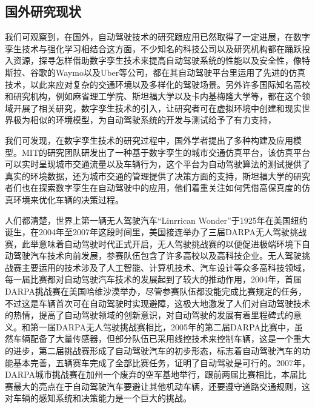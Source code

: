 \subsection{国外研究现状}
我们可观察到，在国外，自动驾驶技术的研究跟应用已然取得了一定进展，在数字孪生技术与强化学习相结合这方面，不少知名的科技公司以及研究机构都在踊跃投入资源，探寻怎样借助数字孪生技术来提高自动驾驶系统的性能以及安全性，像特斯拉、谷歌的Waymo以及Uber等公司，都在其自动驾驶平台里运用了先进的仿真技术，以此来应对复杂的交通环境以及多样化的驾驶场景。另外许多国际知名高校和研究机构，例如麻省理工学院、斯坦福大学以及卡内基梅隆大学等，都在这个领域开展了相关研究，数字孪生技术的引入，让研究者可在虚拟环境中创建和现实世界极为相似的环境模型，为自动驾驶系统的开发与测试给予了有力支持，

我们可发现，在数字孪生技术的研究过程中，国外学者提出了多种构建及应用模型。MIT的研究团队研发出了一种基于数字孪生的城市交通仿真平台，该仿真平台可以实时呈现城市交通流量以及车辆行为，这个平台为自动驾驶算法的测试提供了真实的环境数据，还为城市交通的管理提供了决策方面的支持，斯坦福大学的研究者们也在探索数字孪生在自动驾驶中的应用，他们着重关注如何凭借高保真度的仿真环境来优化车辆的决策过程。

人们都清楚，世界上第一辆无人驾驶汽车“Linrrican Wonder”于1925年在美国纽约诞生，在2004年至2007年这段时间里，美国接连举办了三届DARPA无人驾驶挑战赛，此举意味着自动驾驶时代正式开启，无人驾驶挑战赛的以便促进极端环境下自动驾驶汽车技术向前发展，参赛队伍包含了许多高校以及高科技企业。无人驾驶挑战赛主要运用的技术涉及了人工智能、计算机技术、汽车设计等众多高科技领域，每一届比赛都对自动驾驶汽车技术的发展起到了较大的推动作用，2004年，首届DARPA挑战赛在美国哈维沙漠举办，尽管参赛队伍都没能完成比赛规定的任务，不过这是车辆首次可在自动驾驶时实现避障，这极大地激发了人们对自动驾驶技术的热情，提高了自动驾驶领域的创新意识，对自动驾驶的发展有着里程碑式的意义。和第一届DARPA无人驾驶挑战赛相比，2005年的第二届DARPA比赛中，虽然车辆配备了大量传感器，但部分队伍已采用线控技术来控制车辆，这是一个重大的进步，第二届挑战赛形成了自动驾驶汽车的初步形态，标志着自动驾驶汽车的功能基本完善，五辆赛车完成了全部比赛任务，证明了自动驾驶是可行的。2007年，DARPA城市挑战赛在加州一个废弃的空军基地举行，跟前两届比赛相比，本届比赛最大的亮点在于自动驾驶汽车要避让其他机动车辆，还要遵守道路交通规则，这对车辆的感知系统和决策能力是一个巨大的挑战。

